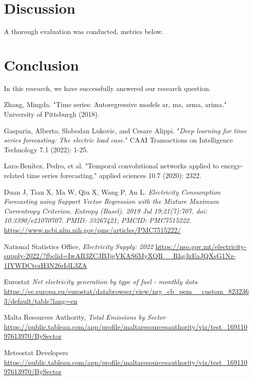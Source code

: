 \documentclass{ieeeaccess}
\begin{document}
\section{Discussion}
A thorough evaluation was conducted, metrics below.


\section{Conclusion}
In this research, we have successfully answered our research question.

\newpage
\begin{thebibliography}{00}

Zhang, Mingda. "Time series: Autoregressive models ar, ma, arma, arima." University of Pittsburgh (2018).

Gasparin, Alberto, Slobodan Lukovic, and Cesare Alippi. "\emph{Deep learning for time series forecasting: The electric load case.}" CAAI Transactions on Intelligence Technology 7.1 (2022): 1-25.

Lara-Benítez, Pedro, et al. "Temporal convolutional networks applied to energy-related time series forecasting." applied sciences 10.7 (2020): 2322.

 Duan J, Tian X, Ma W, Qiu X, Wang P, An L. \emph{Electricity Consumption Forecasting using Support Vector Regression with the Mixture Maximum Correntropy Criterion. Entropy (Basel). 2019 Jul 19;21(7):707. doi: 10.3390/e21070707. PMID: 33267421; PMCID: PMC7515222. }\url{https://www.ncbi.nlm.nih.gov/pmc/articles/PMC7515222/}

 National Statistics Office, \emph{Electricity Supply: 2022} \url{https://nso.gov.mt/electricity-supply-2022/?fbclid=IwAR3ZCJBJjgVKAS6MyXQR__Rhg3zEaJQXsG1Nz-1IYWDCtezH3N26rIdL3ZA}

 Eurostat \emph{Net electricity generation by type of fuel - monthly data} \url{https://ec.europa.eu/eurostat/databrowser/view/nrg_cb_pem__custom_8232363/default/table?lang=en}

 Malta Resources Authority, \emph{Total Emissions by Sector} \url{https://public.tableau.com/app/profile/maltaresourcesauthority/viz/test_16911097613970/BySector}

 Meteostat Developers \url{https://public.tableau.com/app/profile/maltaresourcesauthority/viz/test_16911097613970/BySector}


\end{thebibliography}
\end{document}
